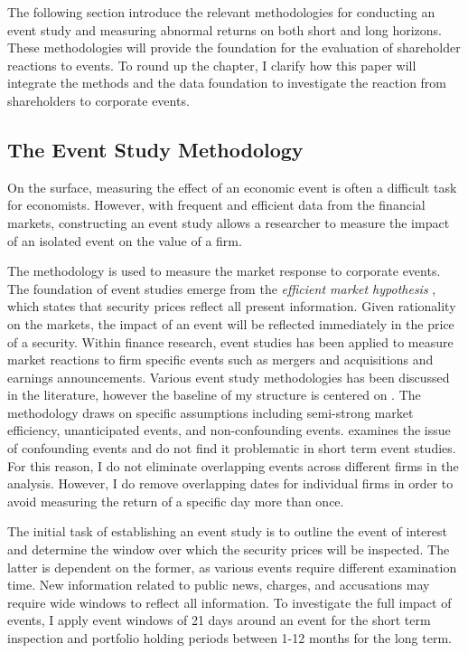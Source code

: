 
The following section introduce the relevant methodologies for conducting an event study and measuring abnormal returns on both short and long horizons. These methodologies will provide the foundation for the evaluation of shareholder reactions to events. To round up the chapter, I clarify how this paper will integrate the methods and the data foundation to investigate the reaction from shareholders to corporate events. 

\subsection{The Event Study Methodology}

On the surface, measuring the effect of an economic event is often a difficult task for economists. However, with frequent and efficient data from the financial markets, constructing an event study allows a researcher to measure the impact of an isolated event on the value of a firm.  

The methodology is used to measure the market response to corporate events. The foundation of event studies emerge from the \textit{efficient market hypothesis} \citep{fama1969_EMH}, which states that security prices reflect all present information. Given rationality on the markets, the impact of an event will be reflected immediately in the price of a security.  Within finance research, event studies has been applied to measure market reactions to firm specific events such as mergers and acquisitions and earnings announcements. Various event study methodologies has been discussed in the literature, however the baseline of my structure is centered on \citep{Event_studies}. The methodology draws on specific assumptions including semi-strong market efficiency, unanticipated events, and non-confounding events. \cite{sorescu2017event} examines the issue of confounding events
and do not find it problematic in short term event studies. For this reason, I do not eliminate overlapping events across different firms in the analysis. However, I do remove overlapping dates for individual firms in order to avoid measuring the return of a specific day more than once.

The initial task of establishing an event study is to outline the event of interest and determine the window over which the security prices will be inspected. The latter is dependent on the former, as various events require different examination time. New information related to public news, charges, and accusations may require wide windows to reflect all information. To investigate the full impact of events, I apply event windows of 21 days around an event for the short term inspection and portfolio holding periods between 1-12 months for the long term. 

